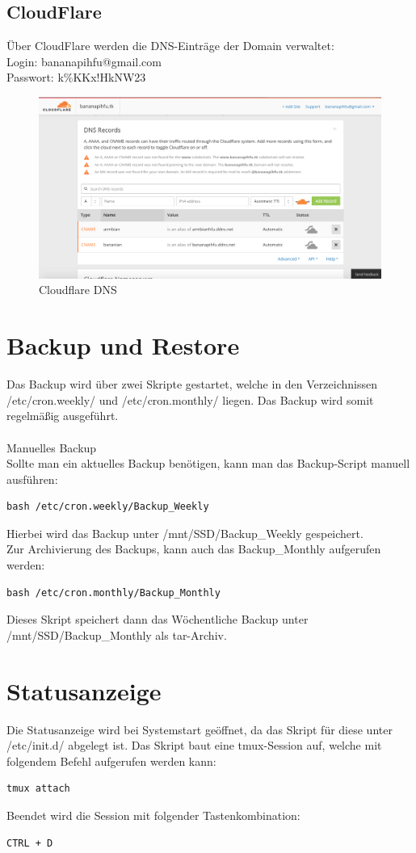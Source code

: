\subsection*{CloudFlare}
Über CloudFlare werden die DNS-Einträge der Domain verwaltet:\\
Login: bananapihfu@gmail.com\\
Passwort: k\%KKx!HkNW23
\begin{figure}[ht]
\includegraphics[width=\textwidth]{pictures/Jonas/Anleitung/BILD5}
\caption{Cloudflare DNS}
\end{figure}

\section{Backup und Restore}
Das Backup wird über zwei Skripte gestartet, welche in den Verzeichnissen /etc/cron.weekly/ und /etc/cron.monthly/ liegen. Das Backup wird somit regelmäßig ausgeführt.\\
~\\
Manuelles Backup\\
Sollte man ein aktuelles Backup benötigen, kann man das Backup-Script manuell ausführen:
\begin{lstlisting}
bash /etc/cron.weekly/Backup_Weekly
\end{lstlisting}
Hierbei wird das Backup unter /mnt/SSD/Backup\_Weekly gespeichert.\\
Zur Archivierung des Backups, kann auch das Backup\_Monthly aufgerufen werden:
\begin{lstlisting}
bash /etc/cron.monthly/Backup_Monthly
\end{lstlisting}
Dieses Skript speichert dann das Wöchentliche Backup unter /mnt/SSD/Backup\_Monthly als tar-Archiv.

\section{Statusanzeige}
Die Statusanzeige wird bei Systemstart geöffnet, da das Skript für diese unter /etc/init.d/ abgelegt ist. Das Skript baut eine tmux-Session auf, welche mit folgendem Befehl aufgerufen werden kann:
\begin{lstlisting}
tmux attach 
\end{lstlisting}
Beendet wird die Session mit folgender Tastenkombination:

\begin{lstlisting}
CTRL + D
\end{lstlisting}












